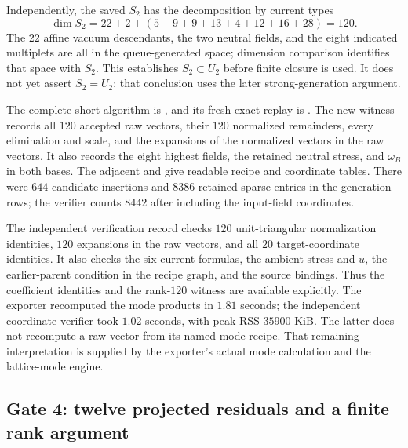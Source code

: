 Independently, the saved $S_2$ has the decomposition by current types
\[
 \dim S_2=22+2+(5+9+9+13+4+12+16+28)=120.
\]
The $22$ affine vacuum descendants, the two neutral fields, and the
eight indicated multiplets are all in the queue-generated space;
dimension comparison identifies that space with $S_2$.
This establishes $S_2\subset U_2$ before finite closure is used.
It does not yet assert $S_2=U_2$; that conclusion uses the later
strong-generation argument.

The complete short algorithm is
, and its fresh
exact replay is
.
The new witness
records all $120$ accepted raw vectors, their $120$ normalized
remainders, every elimination and scale, and the expansions of
the normalized vectors in the raw vectors.  It also records the
eight highest fields, the retained neutral stress, and $\omega_B$
in both bases.  The adjacent
 and
give readable recipe and coordinate tables.  There were $644$
candidate insertions and $8386$ retained sparse entries in the
generation rows; the verifier counts $8442$ after including the
input-field coordinates.

The independent verification record
checks $120$ unit-triangular normalization identities, $120$
expansions in the raw vectors, and all $20$ target-coordinate
identities.  It also checks the six current formulas, the ambient
stress and $u$, the earlier-parent condition in the recipe graph,
and the source bindings.  Thus the coefficient identities and
the rank-$120$ witness are available explicitly.  The exporter
recomputed the mode products in $1.81$ seconds; the independent
coordinate verifier took $1.02$ seconds, with peak RSS $35900$ KiB.
The latter does not recompute a raw vector from its named mode
recipe.  That remaining interpretation is supplied by the
exporter's actual mode calculation and the lattice-mode engine.

\subsection{Gate 4: twelve projected residuals and a finite rank argument}

